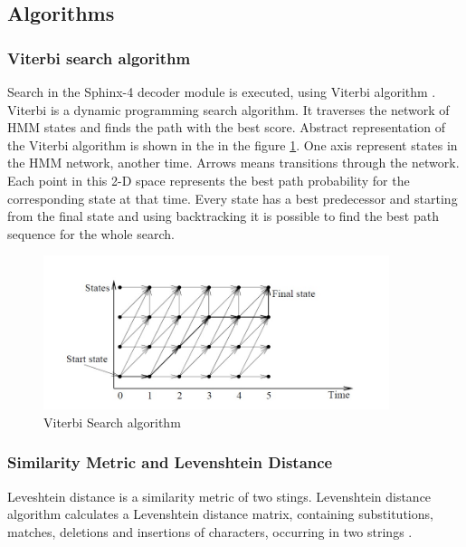 \subsection {Algorithms} 
\subsubsection {Viterbi search algorithm}
Search in the Sphinx-4 decoder module is executed, using Viterbi algorithm
\parencite {Lamereetal2013:Eurospeech}.
Viterbi is a dynamic programming search algorithm. It traverses the network of HMM states and finds the
path with the best score. Abstract representation of the Viterbi algorithm is
shown in the in the figure \ref{fig:Bild6}. One axis represent states in the
HMM network, another time. Arrows means transitions through the network. Each point in this 2-D space represents the best path probability for the corresponding
state at that time. Every state has a best predecessor and starting from the final state and
using backtracking it is possible to find the best path sequence for the whole
search.
\begin{figure}[htbp]
  \centering
     \includegraphics[width=0.9\textwidth]{images/viterbi.jpg}
  \caption{Viterbi Search algorithm \parencite {jurafskymartin2009}}
  \label{fig:Bild6}
\end{figure}

\subsubsection {Similarity Metric and Levenshtein Distance }
Leveshtein distance is a similarity metric of two stings. Levenshtein distance
algorithm calculates a Levenshtein distance matrix, containing substitutions,
matches, deletions and insertions of characters, occurring in two strings
\parencite {levenshtein1966}.  
